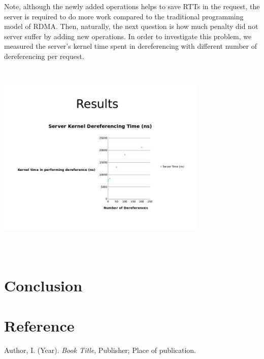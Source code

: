 \documentclass[a4paper, oneside, 10pt]{article}
\begin{document}
Note, although the newly added operations helps to save RTTs in the request, the
server is required to do more work compared to the traditional programming model
of RDMA. Then, naturally, the next question is how much penalty did not server
suffer by adding new operations. In order to investigate this problem, we
measured the server's kernel time spent in dereferencing with different number
of dereferencing per request.\\
\includegraphics[width=10cm,height=10cm,keepaspectratio]{server_kernel_time.jpg}

\section{Conclusion}

\newpage
\section*{Reference}
%
\begin{description}
\item Author, I. (Year). \emph{Book Title}, Publisher; Place of publication.

\end{description}




\end{document}
